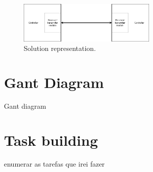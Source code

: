  
 \begin{figure}[htbp]
  \centering
  \includegraphics[width=0.6\textwidth]{Chapters/Figures/Diagrama.png}
  \caption{Solution representation.}
  \label{fig:representation}
\end{figure}



 
 
 
\section{Gant Diagram }
\label{sec:gant_diagram}

Gant diagram

\section{Task building}
\label{sec:task_building}

enumerar as tarefas que irei fazer
